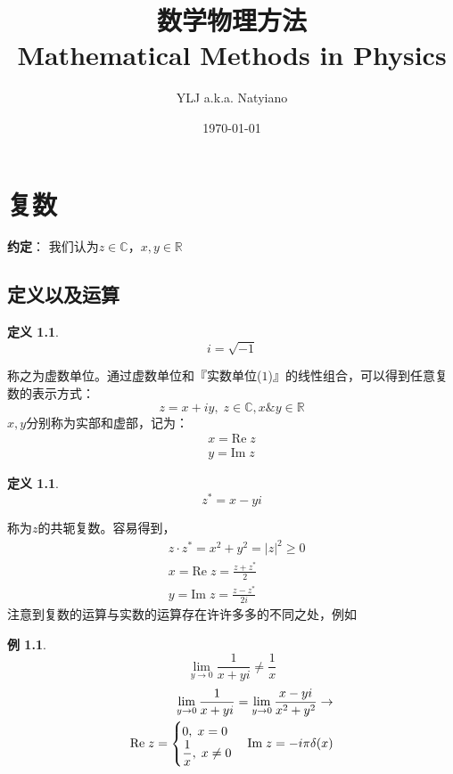 \documentclass[10pt, a4paper, oneside]{ctexbook}
\title{{\Huge{\textbf{数学物理方法}}}\\Mathematical Methods in Physics}
\author{YLJ a.k.a. Natyiano}
\date{\today}
\newtheorem{definition}[theorem]{定义}
\newtheorem{example}[theorem]{例}
\begin{document}
\maketitle

\setcounter{page}{1}
\newpage
{}
\setcounter{page}{1}
\tableofcontents
\newpage
\setcounter{page}{1}

\chapter{复数}
\textbf{约定}：
我们认为$z\in \mathbb{C}$，$x,y \in \mathbb{R}$
\section{定义以及运算}

\begin{definition}
    $$i=\sqrt{-1}$$
\end{definition}
称之为虚数单位。通过虚数单位和『实数单位($1$)』的线性组合，可以得到任意复数的表示方式：
$$z=x+iy,\;z\in \mathbb{C}, x\&y \in \mathbb{R}$$
$x,y$分别称为实部和虚部，记为：
\begin{align*}
    x=\text{Re}\;z\\y=\text{Im}\;z
\end{align*}
\begin{definition}
    $$z^*=x-yi$$
\end{definition}
称为$z$的共轭复数。容易得到，
\begin{align*}
    &z\cdot z^*=x^2+y^2=|z|^2 \ge 0 \\
    &x=\text{Re}\;z=\frac{z+z^*}{2} \\
    &y=\text{Im}\;z=\frac{z-z^*}{2i}
\end{align*}
注意到复数的运算与实数的运算存在许许多多的不同之处，例如
\begin{example}
    $$\lim_{y\to0}\frac{1}{x+yi}\ne \frac{1}{x}$$
    \begin{align*}
    \lim_{y\to0}\frac{1}{x+yi}=\lim_{y\to0}\frac{x-yi}{x^2+y^2}\to\\ \text{\rm Re} \;z= \begin{cases}
        0,\;x=0\\\displaystyle \frac{1}{x},\; x\ne 0
    \end{cases}\text{\rm Im} \;z= -i\pi \delta(x)
    \end{align*}
\end{example}
\end{document}
